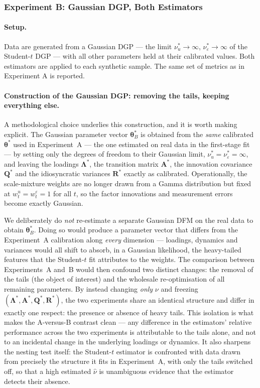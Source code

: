 \documentclass[11pt, a4paper, oneside]{article}
\newcommand{\mA}{\mathbf{A}}
\begin{document}
\subsubsection{Experiment B: Gaussian DGP, Both Estimators}
\label{subsubsec:exp-B}

\paragraph{Setup.}
Data are generated from a Gaussian DGP — the limit
$\nu_u^* \to \infty$, $\nu_\varepsilon^* \to \infty$ of the
Student-$t$ DGP — with all other parameters held at their calibrated
values. Both estimators are applied to each synthetic sample. The
same set of metrics as in Experiment A is reported.

\paragraph{Construction of the Gaussian DGP: removing the tails,
keeping everything else.}
A methodological choice underlies this construction, and it is worth
making explicit. The Gaussian parameter vector
$\boldsymbol{\theta}^*_B$ is obtained from the \emph{same} calibrated
$\boldsymbol{\theta}^*$ used in Experiment~A — the one estimated on
real data in the first-stage fit — by setting only the degrees of
freedom to their Gaussian limit,
$\nu_u^* = \nu_\varepsilon^* = \infty$, and leaving the loadings
$\boldsymbol{\Lambda}^*$, the transition matrix $\mA^*$, the
innovation covariance $\mathbf{Q}^*$ and the idiosyncratic variances
$\mathbf{R}^*$ exactly as calibrated. Operationally, the
scale-mixture weights are no longer drawn from a Gamma distribution
but fixed at $w^u_t = w^\varepsilon_t = 1$ for all $t$, so the factor
innovations and measurement errors become exactly Gaussian.

We deliberately do \emph{not} re-estimate a separate Gaussian DFM on
the real data to obtain $\boldsymbol{\theta}^*_B$. Doing so would
produce a parameter vector that differs from the Experiment~A
calibration along \emph{every} dimension — loadings, dynamics and
variances would all shift to absorb, in a Gaussian likelihood, the
heavy-tailed features that the Student-$t$ fit attributes to the
weights. The comparison between Experiments~A and~B would then
confound two distinct changes: the removal of the tails (the object
of interest) and the wholesale re-optimisation of all remaining
parameters. By instead changing \emph{only} $\nu$ and freezing
$(\boldsymbol{\Lambda}^*, \mA^*, \mathbf{Q}^*, \mathbf{R}^*)$, the two
experiments share an identical structure and differ in exactly one
respect: the presence or absence of heavy tails. This isolation is
what makes the A-versus-B contrast clean — any difference in the
estimators' relative performance across the two experiments is
attributable to the tails alone, and not to an incidental change in
the underlying loadings or dynamics. It also sharpens the nesting
test itself: the Student-$t$ estimator is confronted with data drawn
from precisely the structure it fits in Experiment~A, with only the
tails switched off, so that a high estimated $\hat{\nu}$ is
unambiguous evidence that the estimator detects their absence.
\end{document}
